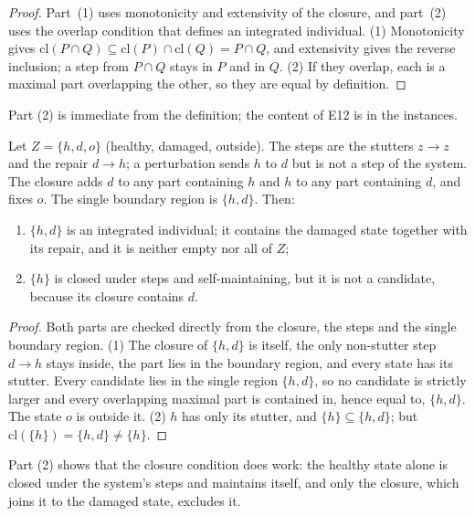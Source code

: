 \begin{proof}
Part~(1) uses monotonicity and extensivity of the closure, and part~(2) uses the overlap condition that defines an integrated individual.
(1) Monotonicity gives $\mathrm{cl}(P \cap Q) \subseteq \mathrm{cl}(P) \cap \mathrm{cl}(Q) = P \cap
Q$, and extensivity gives the reverse inclusion; a step from $P \cap Q$ stays in $P$ and in $Q$.
(2) If they overlap, each is a maximal part overlapping the other, so they are equal by definition.
\end{proof}

Part (2) is immediate from the definition; the content of E12 is in the instances.

\begin{theorem}\label{thm:e12-repair}
Let $Z = \{h, d, o\}$ (healthy, damaged, outside). The steps are the stutters $z \to z$ and the
repair $d \to h$; a perturbation sends $h$ to $d$ but is not a step of the system. The closure adds
$d$ to any part containing $h$ and $h$ to any part containing $d$, and fixes $o$. The single boundary
region is $\{h, d\}$. Then:
\begin{enumerate}
  \item $\{h, d\}$ is an integrated individual; it contains the damaged state together with its
    repair, and it is neither empty nor all of $Z$;
  \item $\{h\}$ is closed under steps and self-maintaining, but it is not a candidate, because its
    closure contains $d$.
\end{enumerate}
\end{theorem}

\begin{proof}
Both parts are checked directly from the closure, the steps and the single boundary region.
(1) The closure of $\{h, d\}$ is itself, the only non-stutter step $d \to h$ stays inside, the part
lies in the boundary region, and every state has its stutter. Every candidate lies in the single
region $\{h, d\}$, so no candidate is strictly larger and every overlapping maximal part is contained
in, hence equal to, $\{h, d\}$. The state $o$ is outside it. (2) $h$ has only its stutter, and
$\{h\} \subseteq \{h, d\}$; but $\mathrm{cl}(\{h\}) = \{h, d\} \ne \{h\}$.
\end{proof}

Part (2) shows that the closure condition does work: the healthy state alone is closed under the
system's steps and maintains itself, and only the closure, which joins it to the damaged state,
excludes it.

